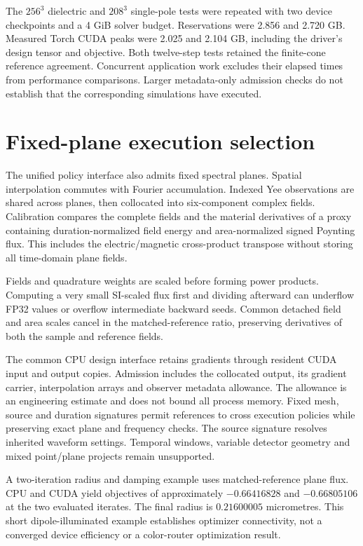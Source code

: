 \documentclass[11pt,a4paper]{article}
\begin{document}
The $256^3$ dielectric and $208^3$ single-pole tests were repeated with two
device checkpoints and a 4 GiB solver budget. Reservations were 2.856 and
2.720 GB. Measured Torch CUDA peaks were 2.025 and 2.104 GB, including the
driver's design tensor and objective. Both twelve-step tests retained the
finite-cone reference agreement. Concurrent application work excludes their
elapsed times from performance comparisons. Larger metadata-only admission
checks do not establish that the corresponding simulations have executed.

\section{Fixed-plane execution selection}
The unified policy interface also admits fixed spectral planes. Spatial
interpolation commutes with Fourier accumulation. Indexed Yee observations
are shared across planes, then collocated into six-component complex fields.
Calibration compares the complete fields and the material derivatives of
a proxy containing duration-normalized field energy and area-normalized
signed Poynting flux. This includes the electric/magnetic cross-product
transpose without storing all time-domain plane fields.

Fields and quadrature weights are scaled before forming power products.
Computing a very small SI-scaled flux first and dividing afterward can
underflow FP32 values or overflow intermediate backward seeds. Common
detached field and area scales cancel in the matched-reference ratio,
preserving derivatives of both the sample and reference fields.

The common CPU design interface retains gradients through resident CUDA
input and output copies. Admission includes the collocated output, its
gradient carrier, interpolation arrays and observer metadata allowance.
The allowance is an engineering estimate and does not bound all process
memory. Fixed mesh, source and duration signatures permit references to
cross execution policies while preserving exact plane and frequency checks.
The source signature resolves inherited waveform settings. Temporal windows,
variable detector geometry and mixed point/plane projects remain unsupported.

A two-iteration radius and damping example uses matched-reference plane flux.
CPU and CUDA yield objectives of approximately $-0.66416828$ and $-0.66805106$
at the two evaluated iterates. The final radius is $0.21600005$ micrometres.
This short dipole-illuminated example establishes optimizer connectivity,
not a converged device efficiency or a color-router optimization result.
\end{document}
